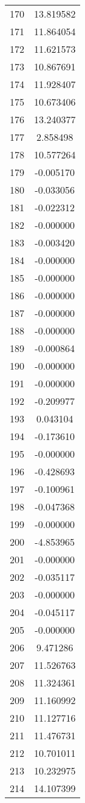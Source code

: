 \documentclass[12pt]{article}
\begin{document}
\begin{longtable}{@{}cc@{}}
170 & 13.819582 \\
171 & 11.864054 \\
172 & 11.621573 \\
173 & 10.867691 \\
174 & 11.928407 \\
175 & 10.673406 \\
176 & 13.240377 \\
177 & 2.858498 \\
178 & 10.577264 \\
179 & -0.005170 \\
180 & -0.033056 \\
181 & -0.022312 \\
182 & -0.000000 \\
183 & -0.003420 \\
184 & -0.000000 \\
185 & -0.000000 \\
186 & -0.000000 \\
187 & -0.000000 \\
188 & -0.000000 \\
189 & -0.000864 \\
190 & -0.000000 \\
191 & -0.000000 \\
192 & -0.209977 \\
193 & 0.043104 \\
194 & -0.173610 \\
195 & -0.000000 \\
196 & -0.428693 \\
197 & -0.100961 \\
198 & -0.047368 \\
199 & -0.000000 \\
200 & -4.853965 \\
201 & -0.000000 \\
202 & -0.035117 \\
203 & -0.000000 \\
204 & -0.045117 \\
205 & -0.000000 \\
206 & 9.471286 \\
207 & 11.526763 \\
208 & 11.324361 \\
209 & 11.160992 \\
210 & 11.127716 \\
211 & 11.476731 \\
212 & 10.701011 \\
213 & 10.232975 \\
214 & 14.107399 \\

\end{longtable}
\end{document}
